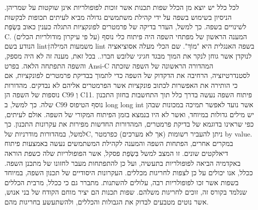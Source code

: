 \begin{טבלא}[!htbp]
      לכל כלל יש יוצא מן הכלל
      שפות תכנות אשר זוכות לפופולריות אינן שוקטות על שמריהן. הניסיון בשימוש בשפה על ידי קהילת משתמשים גדולה מביא לעיתים תכופות לבקשות לשינויים בשפה. כך למשל, העדר בדיקה של פרמטרים לפונקציות התגלה כענין כאוב בִּשְׂפַת C. המענה הראשון של מפתחי השפה היה פיתוח כלי נוסף (על פי עיקרון מודולריות הכלים) הנודע בשם lint†{משמעות המילה lint בשפה האנגלית היא "מוֹךְ". שם הכלי מעלה אסוציאציה לנוקדן אשר גוחן לנקר את המוך מבגד חגיגי שלובש חברו.}. בכל זאת, מענה זה לא היה מספק, והשפה התפתחה הלאה. בפרט Ansi-C המהדורה הראשונה של השפה שזכתה לסטנדרטיזציה, הרחיבה את הדקדוק של השפה כדי לתמוך בבדיקת פרמטרים לפונקציות, אם כי הותירה את האפשרות לכתוב פונקציות אשר הפרמטרים אליהם לא נבדקים. מהדורות נוספות של השפה הן C99 וְ C11.
      פיתוח השפה נעשה בדרך כלל תוך התחשבות בחזון התכנון שלה. כך למשל, ב C99 נוסף הטיפוס
      long long int
      אשר נועד לאפשר תמיכה במכונות שבהן יש מילים גדולות במיוחד, ואשר לא היו בנמצא בזמן הפיתוח המקורי של השפה. אולם לעיתים, כפי שראינו בדוגמא של בדיקת פרמטרים, המהדורות החדשות מפירות את עקרונות התכנון. כך למשל, במהדורות מודרניות שלC, ניתן להעביר רשומות (אך לא מערכים) כפרמטר by value.
      במקרים אחרים, הפתחות השפה והמענה לקהילת המשתמשים נעשה באמצעות פיתוח דיאלקטים שונים. זו המצב למשל בִּשְׂפַת פסקל, אשר הפופולריות שלה כשפת הוראה באקדמיה הביאה לפופולריות בתעשיה, ועל כן להתפתחות מעבר לחזונו של מתכנן השפה.
      ככלל, אנו יכולים על כן לצפות לחריגות מכללים. העקרונות היסודיים של תכנון השפה, במיוחד בשפות אשר זכו לפופולריות רבה, עלולים להשתנות. מתברר גם כי ככלל, מרבית הכללים שנלמד בקורס זה, זוכים לחריגות משלהם. שפות תכנות הם יציר מוחם הקודח של בני אנוש, אשר נוטים מטבעים לבדוק את הגבולות והכללים, ולהשתעשע בחריגות מהם.


\end{טבלא}
